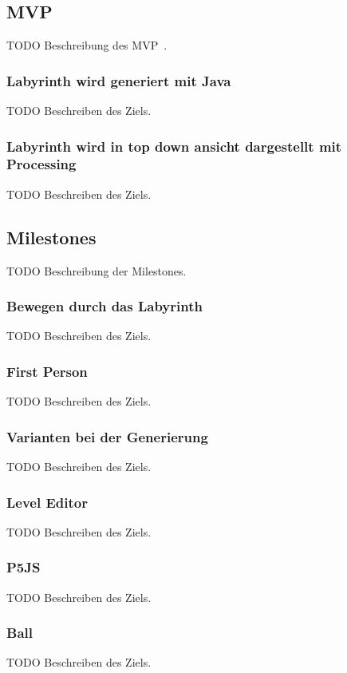 \subsection{MVP}\label{subsec:mvp}
    TODO Beschreibung des MVP~.


    \subsubsection*{Labyrinth wird generiert mit Java}
        TODO Beschreiben des Ziels.


    \subsubsection*{Labyrinth wird in top down ansicht dargestellt mit Processing}
        TODO Beschreiben des Ziels.


\subsection{Milestones}\label{subsec:milestones}
    TODO Beschreibung der Milestones.


    \subsubsection*{Bewegen durch das Labyrinth}
        TODO Beschreiben des Ziels.


    \subsubsection*{First Person}
        TODO Beschreiben des Ziels.


    \subsubsection*{Varianten bei der Generierung}
        TODO Beschreiben des Ziels.


    \subsubsection*{Level Editor}
        TODO Beschreiben des Ziels.


    \subsubsection*{P5JS}
        TODO Beschreiben des Ziels.


    \subsubsection*{Ball}
        TODO Beschreiben des Ziels.
